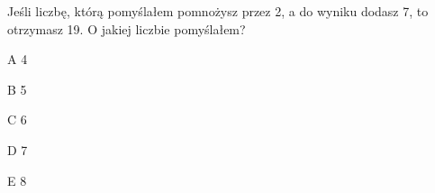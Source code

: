 \begin{tresc}
Jeśli liczbę, którą pomyślałem pomnożysz przez 2, a do wyniku dodasz 7, to otrzymasz 19. O jakiej liczbie pomyślałem?
\end{tresc}
\begin{wariant}{A} 4 \end{wariant}
\begin{wariant}{B} 5 \end{wariant}
\begin{wariant}{C} 6 \end{wariant}
\begin{wariant}{D} 7 \end{wariant}
\begin{wariant}{E} 8 \end{wariant}
